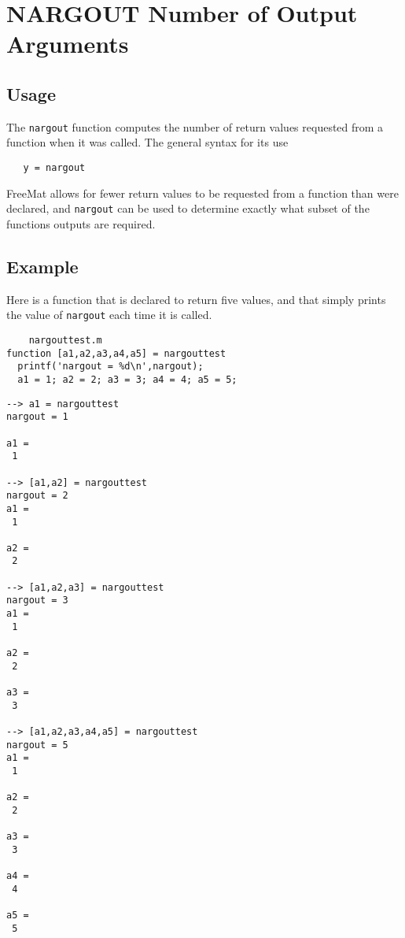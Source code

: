 \section{NARGOUT Number of Output Arguments}

\subsection{Usage}

The \verb|nargout| function computes the number of return values requested from
a function when it was called.  The general syntax for its use
\begin{verbatim}
   y = nargout
\end{verbatim}
FreeMat allows for
fewer return values to be requested from a function than were declared,
and \verb|nargout| can be used to determine exactly what subset of 
the functions outputs are required.  
\subsection{Example}

Here is a function that is declared to return five 
values, and that simply prints the value of \verb|nargout|
each time it is called.
\begin{verbatim}
    nargouttest.m
function [a1,a2,a3,a4,a5] = nargouttest
  printf('nargout = %d\n',nargout);
  a1 = 1; a2 = 2; a3 = 3; a4 = 4; a5 = 5;
\end{verbatim}
\begin{verbatim}
--> a1 = nargouttest
nargout = 1

a1 = 
 1 

--> [a1,a2] = nargouttest
nargout = 2
a1 = 
 1 

a2 = 
 2 

--> [a1,a2,a3] = nargouttest
nargout = 3
a1 = 
 1 

a2 = 
 2 

a3 = 
 3 

--> [a1,a2,a3,a4,a5] = nargouttest
nargout = 5
a1 = 
 1 

a2 = 
 2 

a3 = 
 3 

a4 = 
 4 

a5 = 
 5 
\end{verbatim}
